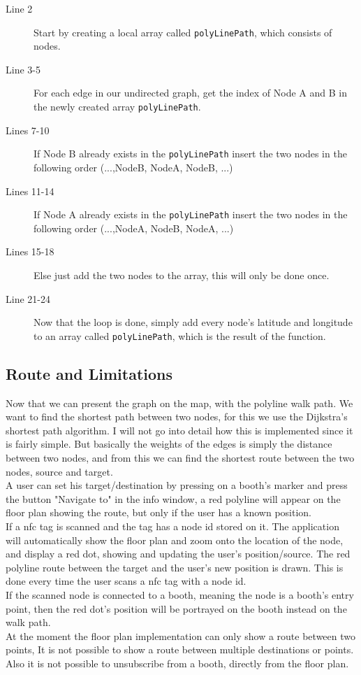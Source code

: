 \begin{description}
\item[Line 2] Start by creating a local array called  \lstinline|polyLinePath|, which consists of nodes.
\item[Line 3-5] For each edge in our undirected graph, get the index of Node A and B in the newly created array \lstinline|polyLinePath|.
\item[Lines 7-10] If Node B already exists in the \lstinline|polyLinePath| insert the two nodes in the following order (...,NodeB, NodeA, NodeB, ...)
\item[Lines 11-14] If Node A already exists in the \lstinline|polyLinePath| insert the two nodes in the following order (...,NodeA, NodeB, NodeA, ...)
\item[Lines 15-18] Else just add the two nodes to the array, this will only be done once.
\item[Line 21-24] Now that the loop is done, simply add every node's latitude and longitude to an array called \lstinline|polyLinePath|, which is the result of the function. 
\end{description}

\subsection*{Route and Limitations}
Now that we can present the graph on the map, with the polyline walk path. We want to find the shortest path between two nodes, for this we use the Dijkstra's shortest path algorithm. I will not go into detail how this is implemented since it is fairly simple. But basically the weights of the edges is simply the distance between two nodes, and from this we can find the shortest route between the two nodes, source and target.\\ 
A user can set his target/destination by pressing on a booth's marker and press the button "Navigate to" in the info window, a red polyline will appear on the floor plan showing the route, but only if the user has a known position.\\
If a \ac{nfc} tag is scanned and the tag has a node id stored on it. The application will automatically show the floor plan and zoom onto the location of the node, and display a red dot, showing and updating the user's position/source. The red polyline route between the target and the user's new position is drawn. This is done every time the user scans a \ac{nfc} tag with a node id.\\
If the scanned node is connected to a booth, meaning the node is a booth's entry point, then the red dot's position will be portrayed on the booth instead on the walk path.\\ 
At the moment the floor plan implementation can only show a route between two points, It is not possible to show a route between multiple destinations or points. Also it is not possible to unsubscribe from a booth, directly from the floor plan.







	
